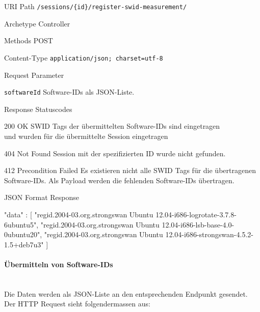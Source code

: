 \begin{mdframed}[style=def]
\begin{description*}
	\item[URI Path] \texttt{/sessions/\{id\}/register-swid-measurement/}
	\item[Archetype] Controller
	\item[Methods] POST
	\item[Content-Type] \texttt{application/json; charset=utf-8}
	\item[Request Parameter] \hfill
	\begin{description*}
		\item[\texttt{softwareId}] Software-IDs als JSON-Liste.
	\end{description*}
	\item[Response Statuscodes] \hfill
		\begin{description*}
			\item[200 OK] SWID Tags der übermittelten Software-IDs sind eingetragen \\
				und wurden für die übermittelte Session eingetragen
			\item[404 Not Found] Session mit der spezifizierten ID wurde nicht gefunden. 
			\item[412 Precondition Failed] Es existieren nicht alle SWID Tags für die
				übertragenen Software-IDs. Als Payload werden die fehlenden Software-IDs
				übertragen.
		\end{description*}
	\item[JSON Format Response] \hfill
	
\begin{jsoncode}
{"data" : 
	[
		"regid.2004-03.org.strongswan Ubuntu 12.04-i686-logrotate-3.7.8-6ubuntu5",
		"regid.2004-03.org.strongswan Ubuntu 12.04-i686-lsb-base-4.0-0ubuntu20",
		"regid.2004-03.org.strongswan Ubuntu 12.04-i686-strongswan-4.5.2-1.5+deb7u3" 
	]
}
\end{jsoncode}
\end{description*}
\end{mdframed}

\paragraph{Übermitteln von Software-IDs} \hspace{0pt} \\
Die Daten werden als JSON-Liste an den entsprechenden Endpunkt gesendet.
Der HTTP Request sieht folgendermassen aus:

